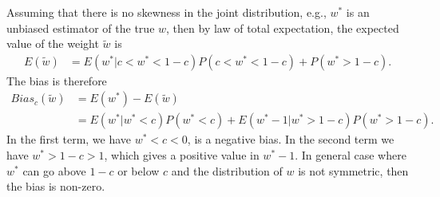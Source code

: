 \documentclass[11pt]{article}
\begin{document}
Assuming that there is no skewness in the joint distribution, e.g.,
\(w^*\) is an unbiased estimator of the true \(w\), then by law of total expectation, the expected value of
the weight \(\tilde{w}\) is
\begin{equation}
\label{eqn: E w trunc}
\begin{aligned}
E(\tilde{w}) &= E(w^*|c<w^*<1-c)P(c<w^*<1-c) + P(w^*>1-c).
\end{aligned}
\end{equation}
The bias is therefore
\begin{equation}
\label{eqn: bias w trunc}
\begin{aligned}
Bias_c(\tilde{w}) &= E(w^*) - E(\tilde{w}) \\
&= E(w^*|w^*<c)P(w^*<c) + E(w^*-1|w^*>1-c)P(w^*>1-c).
\end{aligned}
\end{equation}
In the first term, we have \(w^*<c<0\), is a negative bias. In the second term we have \(w^*>1-c>1\), which
gives a positive value in \(w^*-1\). In general case where \(w^*\) can go
above \(1-c\) or below \(c\) and the distribution of \(w\) is not symmetric, then the
bias is non-zero.

\end{document}
